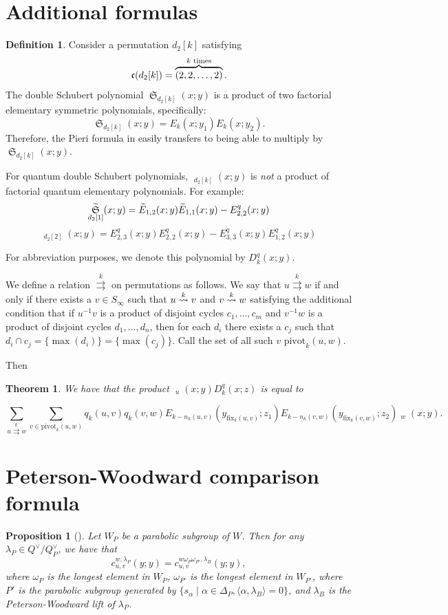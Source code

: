 \documentclass{amsart}
\newtheorem{proposition}[lemma]{Proposition}
\newtheorem{theorem}[lemma]{Theorem}
\theoremstyle{definition}
\newtheorem{definition}[lemma]{Definition}
\theoremstyle{remark}
\numberwithin{equation}{section}
\DeclareMathOperator{\sch}{\mathfrak{S}}
\DeclareMathOperator{\qsch}{\widetilde{\mathfrak{S}}}
\newcommand{\xrightsquigarrow}[2][]{%
	\mathrel{\mathop{\rightsquigarrow}\limits^{\scriptstyle #2}%
	\ifx\hfuzz#1\hfuzz\else_{\scriptstyle #1}\fi}%
}
\newcommand{\tom}[1]{\ensuremath{\xrightsquigarrow{#1}}}
\newcommand{\fx}{\mathrm{fix}}
\begin{document}
\section{Additional formulas}
\newcommand{\dtom}[1]{\overset{#1}{\rightrightarrows}}
\begin{definition}
	Consider a permutation $d_2[k]$ satisfying
	$$\mathfrak{c}(d_2[k]) = \overbrace{(2,2,\ldots,2)}^{k\text{ times}}.$$
	The double Schubert polynomial $\sch_{d_2[k]}(x;y)$ is a product of two factorial elementary symmetric polynomials, specifically:
	$$\sch_{d_2[k]}(x;y) = E_k(x;y_1)E_k(x;y_2).$$
	Therefore, the Pieri formula in \cite{samuelmolev} easily transfers to being able to multiply by $\sch_{d_2[k]}(x;y)$.
	
	For quantum double Schubert polynomials, $\qsch_{d_2[k]}(x;y)$ is \emph{not} a product of factorial quantum elementary polynomials. For example:
	$$\qsch_{d_2[1]}(x;y) = \qelem_{1,2}(x;y)\qelem_{1,1}(x;y) - E^q_{2,2}(x;y)$$
	$$\qsch_{d_2[2]}(x;y) = E^q_{2,3}(x;y)E^q_{2,2}(x;y) - E^q_{3,3}(x;y)E^q_{1,2}(x;y)$$

	For abbreviation purposes, we denote this polynomial by $D_k^q(x;y)$.

	
	We define a relation $\dtom{k}$ on permutations as follows. We say that $u\dtom{k} w$ if and only if there exists a $v\in S_\infty$ such that $u\tom{k} v$ and $v\tom{k} w$ satisfying the additional condition that if $u^{-1}v$ is a product of disjoint cycles $c_1,\ldots,c_m$ and $v^{-1}w$ is a product of disjoint cycles $d_1,\ldots,d_n$, then for each $d_i$ there exists a $c_j$ such that $d_i\cap c_j = \{\max(d_i)\} = \{\max(c_j)\}$. Call the set of all such $v$ $\mathrm{pivot}_k(u,w)$.
\end{definition}

Then
\begin{theorem}
	We have that the product $\qsch_u(x;y)D_k^q(x;z)$ is equal to
	
	$$\sum_{u\dtom{k} w} \sum_{v\in\mathrm{pivot}_k(u,w)}q_k(u,v)q_k(v,w)E_{k-n_k(u,v)}(y_{\fx_{k}(u,v)};z_1)E_{k-n_k(v,w)}(y_{\fx_{k}(v,w)};z_2)\qsch_w(x;y).$$
\end{theorem}

\section{Peterson-Woodward comparison formula}

\begin{proposition}[{\cite[Proposition~2.10]{huang2015equivariant}}]
Let $W_P$ be a parabolic subgroup of $W$. Then for any $\lambda_P\in Q^\vee/Q_P^\vee$, we have that
$$c_{u,v}^{w,\lambda_P}(y;y) = c_{u,v}^{w\omega_P\omega_{P'},\lambda_B}(y;y),$$
where $\omega_P$ is the longest element in $W_P$, $\omega_{P'}$ is the longest element in $W_{P'}$, where $P'$ is the parabolic subgroup generated by $\{s_\alpha\mid \alpha\in\Delta_P,\langle \alpha, \lambda_B\rangle=0\}$, and $\lambda_B$ is the Peterson-Woodward lift of $\lambda_P$. 
\end{proposition}
\end{document}
